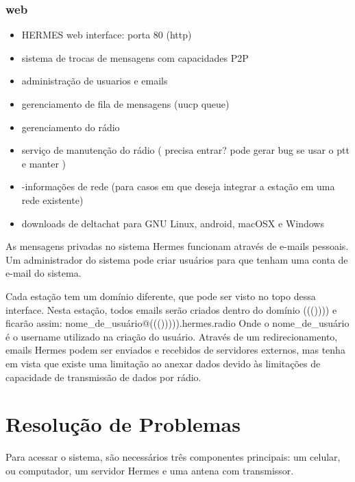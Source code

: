 \documentclass[11pt,a4paper]{article}
\begin{document}
\subsubsection{web}
\begin{itemize}
      \item HERMES web interface: porta 80 (http)
      \item sistema de trocas de mensagens com capacidades P2P
      \item administração de usuarios e emails
      \item gerenciamento de fila de mensagens (uucp queue)
      \item gerenciamento do rádio
      \item serviço de manutenção do rádio ( precisa entrar? pode gerar bug se usar o ptt e manter )
      \item-informações de rede (para casos em que deseja integrar a estação em uma rede existente)
      \item downloads de deltachat para GNU Linux, android, macOSX e Windows
\end{itemize}


As mensagens privadas no sistema Hermes funcionam através de e-mails pessoais. Um administrador do sistema pode criar usuários para que tenham uma conta de e-mail do sistema.

Cada estação tem um domínio diferente, que pode ser visto no topo dessa interface. Nesta estação, todos emails serão criados dentro do domínio ((()))) e ficarão assim:
nome\_de\_usuário@((())))).hermes.radio 
Onde o nome\_de\_usuário é o username utilizado na criação do usuário.
Através de um redirecionamento, emails Hermes podem ser enviados e recebidos de servidores externos, mas tenha em vista que existe uma limitação ao anexar dados devido às limitações de capacidade de transmissão de dados por rádio.



\section{Resolução de Problemas}

Para acessar o sistema, são necessários três componentes principais: um celular, ou computador, um servidor Hermes e uma antena com transmissor. 


\end{document}
